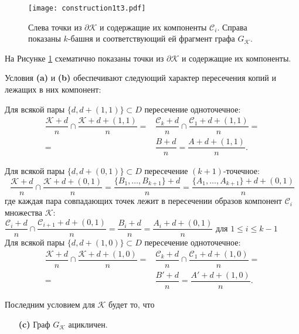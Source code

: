 \begin{figure}[h!]
\texttt{[image: construction1t3.pdf]}
\caption{Слева точки из $ \partial{\mathcal{K}}$ и содержащие их компоненты $\mathcal{C}_i$. Справа показаны $k$-башня и соответствующий ей фрагмент графа $G_{\mathcal{K}}$.}
\label{fig:constr1}
\end{figure}
На Рисунке \ref{fig:constr1} схематично показаны точки из $ \partial{\mathcal{K}}$ и содержащие их компоненты.

Условия {\bf(a)} и {\bf(b)} обеспечивают следующий характер пересечения копий и лежащих в них компонент:

Для всякой пары $\{d,d+(1,1)\}\subset D$ пересечение одноточечное:
\begin{equation*}
\begin{split}
\dfrac{{\mathcal{K}}+d}{n}\cap\dfrac{{\mathcal{K}}+d+(1,1)}{n}=&\dfrac{{\mathcal{C}}_k+d}{n}\cap\dfrac{{\mathcal{C}}_1+d+(1,1)}{n}=\\
=&\dfrac{B+d}{n}=\dfrac{A+d+(1,1)}{n}.
\end{split}
\end{equation*}

Для всякой пары $\{d,d+(0,1)\}\subset D$ пересечение $(k+1)$-точечное:
$$\dfrac{{\mathcal{K}}+d}{n}\cap\dfrac{{\mathcal{K}}+d+(0,1)}{n}=\dfrac{\{B_1,\ldots,B_{k+1}\}+d}{n}=\dfrac{\{A_1,\ldots,A_{k+1}\}+d+(0,1)}{n}$$
где каждая пара совпадающих точек лежит в пересечении образов компонент ${\mathcal{C}}_i$ множества  ${\mathcal{K}}$:\\

 $\dfrac{{\mathcal{C}}_i+d}{n}\cap\dfrac{{\mathcal{C}}_{i+1}+d+(0,1)}{n}=\dfrac{B_i+d}{n}=\dfrac{A_i+d+(0,1)}{n}$ для $1\leq i\leq k-1$\\

Для всякой пары $\{d,d+(1,0)\}\subset D$ пересечение одноточечное:
\begin{equation*}
\begin{split}
\dfrac{{\mathcal{K}}+d}{n}\cap\dfrac{{\mathcal{K}}+d+(1,0)}{n}=&\dfrac{{\mathcal{C}}_k+d}{n}\cap\dfrac{{\mathcal{C}}_1+d+(1,0)}{n}=\\
=&\dfrac{B'+d}{n}=\dfrac{A'+d+(1,0)}{n}.
\end{split}
\end{equation*}


Последним условием для ${\mathcal{K}}$ будет то, что
\begin{enumerate}
\item[{\bf(c)}] Граф $G_{\mathcal{K}}$ ацикличен.
\end{enumerate}


